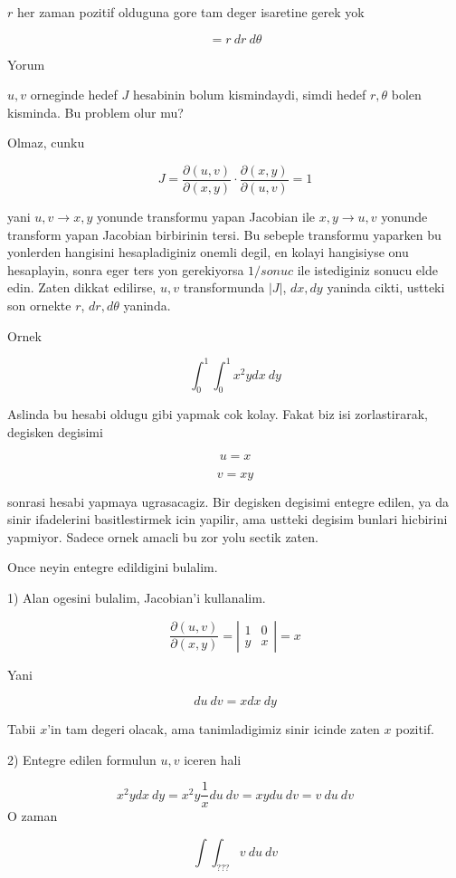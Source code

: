 \documentclass[12pt,fleqn]{article}\usepackage{../common}
\begin{document}
$r$ her zaman pozitif olduguna gore tam deger isaretine gerek yok

\[ = r \ dr \ d\theta\]

Yorum 

$u,v$ orneginde hedef $J$ hesabinin bolum kismindaydi, simdi hedef
$r,\theta$ bolen kisminda. Bu problem olur mu? 

Olmaz, cunku 

\[ J = \frac{\partial (u,v)}{\partial(x,y)} \cdot
\frac{\partial (x,y)}{\partial(u,v)} = 1
 \]

yani $u,v \to x,y$ yonunde transformu yapan Jacobian ile $x,y \to u,v$
yonunde transform yapan Jacobian birbirinin tersi. Bu sebeple transformu
yaparken bu yonlerden hangisini hesapladiginiz onemli degil, en kolayi
hangisiyse onu hesaplayin, sonra eger ters yon gerekiyorsa $1 / sonuc$ ile
istediginiz sonucu elde edin. Zaten dikkat edilirse, $u,v$ transformunda
$|J|$, $dx,dy$ yaninda cikti, ustteki son ornekte $r$, $dr,d\theta$
yaninda. 

Ornek

\[ \int_0^1 \int_0^1 x^2y dx \ dy  \]

Aslinda bu hesabi oldugu gibi yapmak cok kolay. Fakat biz isi
zorlastirarak, degisken degisimi

\[ u =x  \]

\[ v = xy \]

sonrasi hesabi yapmaya ugrasacagiz. Bir degisken degisimi entegre edilen,
ya da sinir ifadelerini basitlestirmek icin yapilir, ama ustteki degisim
bunlari hicbirini yapmiyor. Sadece ornek amacli bu zor yolu sectik zaten. 

Once neyin entegre edildigini bulalim. 

1) Alan ogesini bulalim, Jacobian'i kullanalim. 

\[ \frac{\partial (u,v)}{\partial(x,y)}  = 
\left|\begin{array}{rr}
1 & 0 \\
y & x
\end{array}\right| = 
x
 \]

Yani

\[ du \ dv = x dx \ dy \]

Tabii $x$'in tam degeri olacak, ama tanimladigimiz sinir icinde zaten $x$
pozitif. 

2) Entegre edilen formulun $u,v$ iceren hali 

\[ x^2y dx \ dy =  x^2y  \frac{1}{x} du \ dv = 
xy du \ dv = 
v \ du \ dv 
\]
O zaman 

\[ \int \int _{???} v \ du \ dv \]
\end{document}
